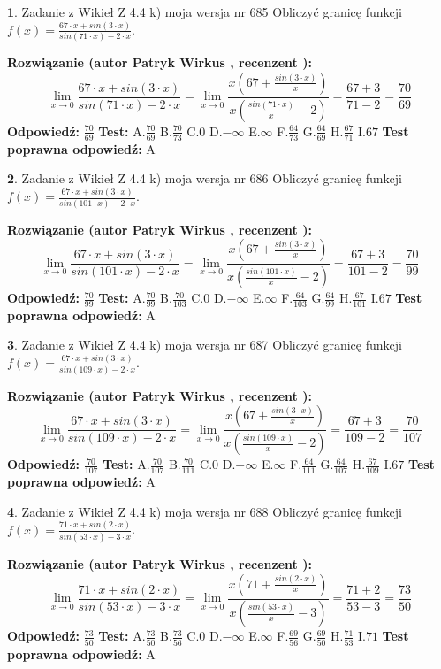 \documentclass[12pt, a4paper]{article}
\theoremstyle{definition} %
\newtheorem{zad}{}
\newcommand{\zadStart}[1]{\begin{zad}#1\newline}
\newcommand{\zadStop}{\end{zad}}
\newcommand{\rozwStart}[2]{\noindent \textbf{Rozwiązanie (autor #1 , recenzent #2): }\newline}
\newcommand{\rozwStop}{\newline}
\newcommand{\odpStart}{\noindent \textbf{Odpowiedź:}\newline}
\newcommand{\odpStop}{\newline}
\newcommand{\testStart}{\noindent \textbf{Test:}\newline}
\newcommand{\testStop}{\newline}
\newcommand{\kluczStart}{\noindent \textbf{Test poprawna odpowiedź:}\newline}
\newcommand{\kluczStop}{\newline}
\begin{document}
\zadStart{Zadanie z Wikieł Z 4.4 k) moja wersja nr 685}
Obliczyć granicę funkcji $f(x)=\frac{67\cdot x +sin(3\cdot x)}{sin(71\cdot x) -2\cdot x}$.
\zadStop
\rozwStart{Patryk Wirkus}{}
$$\lim\limits_{x\to 0}\frac{67\cdot x +sin(3\cdot x)}{sin(71\cdot x) -2\cdot x}
=\lim\limits_{x\to 0}\frac{x(67+\frac{sin(3\cdot x)}{x})}{x(\frac{sin(71\cdot x)}{x}-2)}
=\frac{67+3}{71-2} = \frac{70}{69}$$
\rozwStop
\odpStart
$\frac{70}{69}$
\odpStop
\testStart
A.$\frac{70}{69}$
B.$\frac{70}{73}$
C.$0$
D.$-\infty$
E.$\infty$
F.$\frac{64}{73}$
G.$\frac{64}{69}$
H.$\frac{67}{71}$
I.$67$
\testStop
\kluczStart
A
\kluczStop



\zadStart{Zadanie z Wikieł Z 4.4 k) moja wersja nr 686}
Obliczyć granicę funkcji $f(x)=\frac{67\cdot x +sin(3\cdot x)}{sin(101\cdot x) -2\cdot x}$.
\zadStop
\rozwStart{Patryk Wirkus}{}
$$\lim\limits_{x\to 0}\frac{67\cdot x +sin(3\cdot x)}{sin(101\cdot x) -2\cdot x}
=\lim\limits_{x\to 0}\frac{x(67+\frac{sin(3\cdot x)}{x})}{x(\frac{sin(101\cdot x)}{x}-2)}
=\frac{67+3}{101-2} = \frac{70}{99}$$
\rozwStop
\odpStart
$\frac{70}{99}$
\odpStop
\testStart
A.$\frac{70}{99}$
B.$\frac{70}{103}$
C.$0$
D.$-\infty$
E.$\infty$
F.$\frac{64}{103}$
G.$\frac{64}{99}$
H.$\frac{67}{101}$
I.$67$
\testStop
\kluczStart
A
\kluczStop



\zadStart{Zadanie z Wikieł Z 4.4 k) moja wersja nr 687}
Obliczyć granicę funkcji $f(x)=\frac{67\cdot x +sin(3\cdot x)}{sin(109\cdot x) -2\cdot x}$.
\zadStop
\rozwStart{Patryk Wirkus}{}
$$\lim\limits_{x\to 0}\frac{67\cdot x +sin(3\cdot x)}{sin(109\cdot x) -2\cdot x}
=\lim\limits_{x\to 0}\frac{x(67+\frac{sin(3\cdot x)}{x})}{x(\frac{sin(109\cdot x)}{x}-2)}
=\frac{67+3}{109-2} = \frac{70}{107}$$
\rozwStop
\odpStart
$\frac{70}{107}$
\odpStop
\testStart
A.$\frac{70}{107}$
B.$\frac{70}{111}$
C.$0$
D.$-\infty$
E.$\infty$
F.$\frac{64}{111}$
G.$\frac{64}{107}$
H.$\frac{67}{109}$
I.$67$
\testStop
\kluczStart
A
\kluczStop



\zadStart{Zadanie z Wikieł Z 4.4 k) moja wersja nr 688}
Obliczyć granicę funkcji $f(x)=\frac{71\cdot x +sin(2\cdot x)}{sin(53\cdot x) -3\cdot x}$.
\zadStop
\rozwStart{Patryk Wirkus}{}
$$\lim\limits_{x\to 0}\frac{71\cdot x +sin(2\cdot x)}{sin(53\cdot x) -3\cdot x}
=\lim\limits_{x\to 0}\frac{x(71+\frac{sin(2\cdot x)}{x})}{x(\frac{sin(53\cdot x)}{x}-3)}
=\frac{71+2}{53-3} = \frac{73}{50}$$
\rozwStop
\odpStart
$\frac{73}{50}$
\odpStop
\testStart
A.$\frac{73}{50}$
B.$\frac{73}{56}$
C.$0$
D.$-\infty$
E.$\infty$
F.$\frac{69}{56}$
G.$\frac{69}{50}$
H.$\frac{71}{53}$
I.$71$
\testStop
\kluczStart
A
\kluczStop
\end{document}
